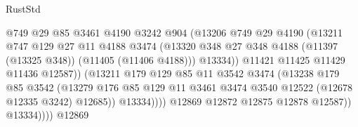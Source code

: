 \begin{lexlean}{RustStd}
\begin{coremodule}
                                    @749
                                    @29
                                    @85
                                    @3461
                                    @4190
                                    @3242
                                    @904
                                    (@13206
                                      @749
                                      @29
                                      @4190
                                      (@13211
                                        @747
                                        @129
                                        @27
                                        @11
                                        @4188
                                        @3474
                                        (@13320
                                          @348
                                          @27
                                          @348
                                          @4188
                                          (@11397 (@13325 @348))
                                          (@11405 (@11406 @4188)))
                                        @13334))
                                    @11421
                                    @11425
                                    @11429
                                    @11436
                                    @12587))
                                (@13211
                                  @179
                                  @129
                                  @85
                                  @11
                                  @3542
                                  @3474
                                  (@13238
                                    @179
                                    @85
                                    @3542
                                    (@13279
                                      @176
                                      @85
                                      @129
                                      @11
                                      @3461
                                      @3474
                                      @3540
                                      @12522
                                      (@12678 @12335 @3242)
                                      @12685))
                                  @13334))))
                          @12869
                          @12872
                          @12875
                          @12878
                          @12587))
                      @13334))))
              @12869

\end{coremodule}
\end{lexlean}
